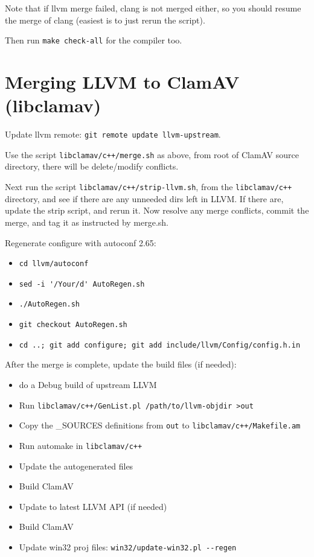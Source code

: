 Note that if llvm merge failed, clang is not merged either, so you should resume
the merge of clang (easiest is to just rerun the script).

Then run \verb+make check-all+ for the compiler too.

\section{Merging LLVM to ClamAV (libclamav)}
Update llvm remote: \verb+git remote update llvm-upstream+.

Use the script \verb|libclamav/c++/merge.sh| as above, from root of ClamAV
source directory, there will be delete/modify conflicts.

Next run the script \verb|libclamav/c++/strip-llvm.sh|, from the
\verb|libclamav/c++| directory, and see if there are any
unneeded dirs left in LLVM. If there are, update the strip script, and rerun it.
Now resolve any merge conflicts, commit the merge, and tag it as instructed by
merge.sh.

Regenerate configure with autoconf 2.65:
\begin{itemize}
\item \verb+cd llvm/autoconf+
\item \verb+sed -i '/Your/d' AutoRegen.sh+
\item \verb+./AutoRegen.sh+
\item \verb+git checkout AutoRegen.sh+
\item \verb+cd ..; git add configure; git add include/llvm/Config/config.h.in+
\end{itemize}

After the merge is complete, update the build files (if needed):
\begin{itemize}
\item do a Debug build of upstream LLVM
\item Run \verb|libclamav/c++/GenList.pl /path/to/llvm-objdir >out|
\item Copy the \_SOURCES definitions from \verb+out+ to
\verb|libclamav/c++/Makefile.am|
\item Run automake in \verb|libclamav/c++|
\item Update the autogenerated files
\item Build ClamAV
\item Update to latest LLVM API (if needed)
\item Build ClamAV
\item Update win32 proj files: \verb+win32/update-win32.pl --regen+
\end{itemize}

